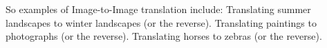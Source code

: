 \documentclass[preview]{standalone}
\begin{document}
\begin{center}
So examples of Image-to-Image translation include:
    Translating summer landscapes to winter landscapes (or the reverse).
    Translating paintings to photographs (or the reverse).
    Translating horses to zebras (or the reverse).
\end{center}
\end{document}

